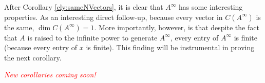 \documentclass[titlepage]{article}
\newcounter{corollary}
\begin{document}
After Corollary \ref{cly:sameNVectors}, it is clear that $A^\infty$ has some interesting properties. As an interesting direct follow-up, because every vector in $C(A^\infty)$ is the same, $\dim C(A^\infty)=1$. More importantly, however, is that despite the fact that $A$ is raised to the infinite power to generate $A^\infty$, every entry of $A^\infty$ is finite (because every entry of $x$ is finite). This finding will be instrumental in proving the next corollary.\par
\textcolor{red}{\emph{New corollaries coming soon!}}
\newpage



\printglossaries
\newpage





\end{document}
